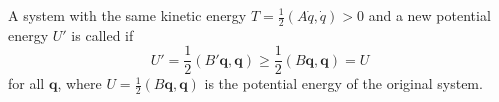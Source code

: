 A system with the same kinetic energy $T = \frac{1}{2}(A\dot{q}, \dot{q}) > 0$ and a new potential energy $U'$ is called  if
$$U' = \frac{1}{2}(B'\mathbf{q}, \mathbf{q}) \geq \frac{1}{2}(B\mathbf{q}, \mathbf{q}) = U$$
for all $\mathbf{q}$, where $U = \frac{1}{2}(B\mathbf{q}, \mathbf{q})$ is the potential energy of the original system.

